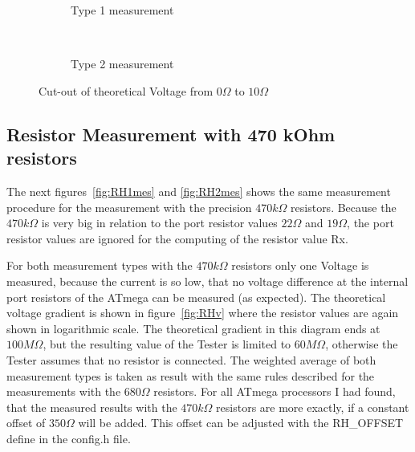 \begin{figure}[H]
  \begin{subfigure}[b]{9cm}
    \centering
    \resizebox{9cm}{!}{}
    \caption{Type 1 measurement}
    \label{fig:RLvlow}
  \end{subfigure}
  ~
  \begin{subfigure}[b]{9cm}
    \centering
    \resizebox{9cm}{!}{}
    \caption{Type 2 measurement}
    \label{fig:RLvhigh}
  \end{subfigure}
  \caption{Cut-out of theoretical Voltage from \(0\Omega\) to \(10\Omega\)}
\end{figure}


\subsection{Resistor Measurement with 470 kOhm resistors}
The next figures~\ref{fig:RH1mes} and \ref{fig:RH2mes} shows the same measurement procedure for the
measurement with the precision \(470k\Omega\) resistors. Because the \(470k\Omega\) is very big in relation
to the port resistor values \(22\Omega\) and \(19\Omega\), the port resistor values are ignored for the computing
of the resistor value Rx.

For both measurement types with the \(470k\Omega\) resistors only one Voltage is measured, because the current
is so low, that no voltage difference at the internal port resistors of the ATmega can be measured (as expected).
The theoretical voltage gradient is shown in figure~\ref{fig:RHv} where the resistor values are again shown in logarithmic scale.
The theoretical gradient in this diagram ends at \(100M\Omega\), but the resulting value of the Tester is
limited to \(60M\Omega\), otherwise the Tester assumes that no resistor is connected.
The weighted average of both measurement types is taken as result with the same rules described for the measurements with the \(680\Omega\) resistors.
For all ATmega processors I had found, that the measured results with the \(470k\Omega\) resistors are more exactly,
if a constant offset of \(350\Omega\) will be added. This offset can be adjusted with the RH\_OFFSET define in the config.h file.

